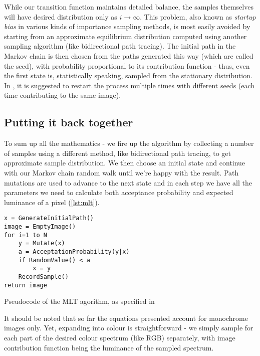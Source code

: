 While our transition function maintains detailed balance, the samples themselves will have desired distribution only as $i \to \infty$. This problem, also known as \emph{startup bias} in various kinds of importance sampling methods, is most easily avoided by starting from an approximate equilibrium distribution computed using another sampling algorithm (like bidirectional path tracing). The initial path in the Markov chain is then chosen from the paths generated this way (which are called the seed), with probability proportional to its contribution function - thus, even the first state is, statistically speaking, sampled from the stationary distribution. In \cite{Veach:1997:MLT:258734.258775}, it is suggested to restart the process multiple times with different seeds (each time contributing to the same image).

\subsection{Putting it back together}

To sum up all the mathematics - we fire up the algorithm by collecting a number of samples using a different method, like bidirectional path tracing, to get approximate sample distribution. We then choose an initial state and continue with our Markov chain random walk until we're happy with the result. Path mutations are used to advance to the next state and in each step we have all the parameters we need to calculate both acceptance probability and expected luminance of a pixel (\ref{lst:mlt}).

\begin{listing}
\begin{verbatim}
x = GenerateInitialPath()
image = EmptyImage()
for i=1 to N
	y = Mutate(x)
	a = AcceptationProbability(y|x)
	if RandomValue() < a
		x = y
	RecordSample()
return image
\end{verbatim}
\caption{Pseudocode of the MLT agorithm, as specified in \cite{Veach:1997:MLT:258734.258775}}
\label{lst:mlt}
\end{listing}

It should be noted that so far the equations presented account for monochrome images only. Yet, expanding into colour is straightforward - we simply sample for each part of the desired colour spectrum (like RGB) separately, with image contribution function being the luminance of the sampled spectrum.

